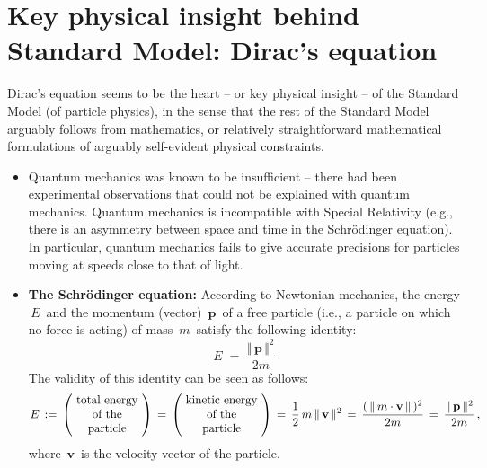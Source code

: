
\section{Key physical insight behind Standard Model: Dirac's equation}
Dirac's equation seems to be the heart -- or key physical insight -- of the Standard Model (of particle physics),
in the sense that the rest of the Standard Model arguably follows from mathematics, or relatively straightforward
mathematical formulations of arguably self-evident physical constraints.
\begin{itemize}
\item
	Quantum mechanics was known to be insufficient -- there had been experimental observations
	that could not be explained with quantum mechanics.
	Quantum mechanics is incompatible with Special Relativity (e.g., there is an asymmetry between space and time
	in the Schr\"odinger equation).
	In particular, quantum mechanics fails to give accurate precisions for particles moving at speeds close to
	that of light.
\item
	\textbf{The Schr\"odinger equation:}
	\vskip 0.01cm
	According to Newtonian mechanics, the energy \,$E$\, and the momentum (vector) \,$\mathbf{p}$\,
	of a free particle (i.e., a particle on which no force is acting) of mass \,$m$\,
	satisfy the following identity:
	\begin{equation}
	\label{NewtonionEnergyMomemtumRelation}
	E \;=\; \dfrac{\Vert\,\mathbf{p}\,\Vert^{2}}{2m}
	\end{equation}
	The validity of this identity can be seen as follows:
	\begin{equation*}
	E
	\,:=\,
		\left(\!\begin{array}{c} \textnormal{total energy} \\ \textnormal{of the} \\ \textnormal{particle} \end{array}\!\right)
	\,=\,
		\left(\!\begin{array}{c} \textnormal{kinetic energy} \\ \textnormal{of the} \\ \textnormal{particle} \end{array}\!\right)
	\,=\,
		\dfrac{1}{2}\,m\,\Vert\,\mathbf{v}\,\Vert^{2}
	\,=\,
		\dfrac{(\,\Vert\,m\cdot\mathbf{v}\,\Vert\,)^{2}}{2m}
	\,=\,
		\dfrac{\Vert\,\mathbf{p}\,\Vert^{2}}{2m}\,,
	\end{equation*}
	where \,$\mathbf{v}$\, is the velocity vector of the particle.

\end{itemize}
